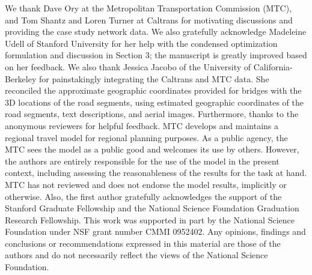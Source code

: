 \acks
We thank Dave Ory at the Metropolitan Transportation Commission (MTC), and Tom Shantz and Loren Turner at Caltrans for motivating discussions and providing the case study network data. We also gratefully acknowledge Madeleine Udell of Stanford University for her help with the condensed optimization formulation and discussion in Section 3; the manuscript is greatly improved based on her feedback. We also thank Jessica Jacobo of the University of California-Berkeley for painstakingly integrating the Caltrans and MTC data. She reconciled the approximate geographic coordinates provided for bridges with the 3D locations of the road segments, using estimated geographic coordinates of the road segments, text descriptions, and aerial images. Furthermore, thanks to the anonymous reviewers for helpful feedback. MTC develops and maintains a regional travel model for regional planning purposes.  As a public agency, the MTC sees the model as a public good and welcomes its use by others.  However, the authors are entirely responsible for the use of the model in the present context, including assessing the reasonableness of the results for the task at hand.  MTC has not reviewed and does not endorse the model results, implicitly or otherwise. Also, the first author gratefully acknowledges the support of the Stanford Graduate Fellowship and the National Science Foundation Graduation Research Fellowship. This work was supported in part by the National Science Foundation under NSF grant number CMMI 0952402. Any opinions, findings and conclusions or recommendations expressed in this material are those of the authors and do not necessarily reflect the views of the National Science Foundation. 